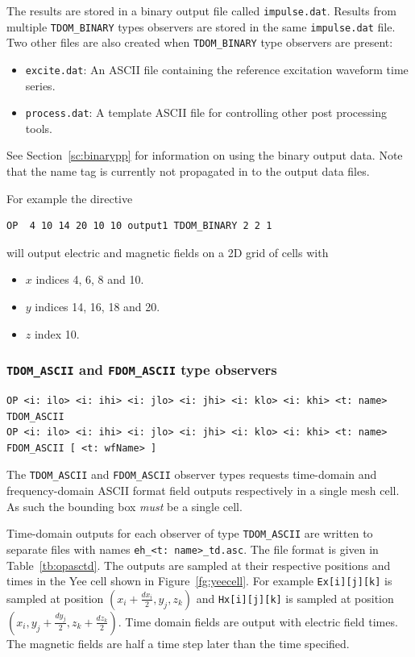 \documentclass[onecolumn,a4paper]{article}
\numberwithin{equation}{section}
\begin{document}
The results are stored in a binary output file called \texttt{impulse.dat}. Results from multiple
\texttt{TDOM\_BINARY} types observers are stored in the same \texttt{impulse.dat} file. Two other
files are also created when \texttt{TDOM\_BINARY} type observers are present: 
\begin{itemize}
 \item \texttt{excite.dat}: An ASCII file containing the reference excitation waveform time series.
 \item \texttt{process.dat}: A template ASCII file for controlling other post processing tools.
\end{itemize}
See Section~\ref{sc:binarypp} for information on using the binary output data. Note that the name tag is currently
not propagated in to the output data files.

For example the directive 
\begin{verbatim}
OP  4 10 14 20 10 10 output1 TDOM_BINARY 2 2 1
\end{verbatim}
will output electric and magnetic fields on a 2D grid of cells with 
\begin{itemize}
 \item $x$ indices 4, 6, 8 and 10.
 \item $y$ indices 14, 16, 18 and 20. 
 \item $z$ index 10. 
\end{itemize}

\subsubsection{\texttt{TDOM\_ASCII} and \texttt{FDOM\_ASCII} type observers}

\begin{verbatim}
OP <i: ilo> <i: ihi> <i: jlo> <i: jhi> <i: klo> <i: khi> <t: name> TDOM_ASCII
OP <i: ilo> <i: ihi> <i: jlo> <i: jhi> <i: klo> <i: khi> <t: name> FDOM_ASCII [ <t: wfName> ]
\end{verbatim}

The \texttt{TDOM\_ASCII} and \texttt{FDOM\_ASCII} observer types requests time-domain and 
frequency-domain ASCII format field outputs respectively in a single mesh cell. As such the 
bounding box {\em must} be a single cell. 

Time-domain outputs for each observer of type \texttt{TDOM\_ASCII} are written to separate files 
with names \texttt{eh\_<t:~name>\_td.asc}. The file format is given in Table~\ref{tb:opasctd}.
The outputs are sampled at their respective positions and times in the Yee cell shown in 
Figure~\ref{fg:yeecell}. For example \texttt{Ex[i][j][k]} is sampled 
at position  $(x_i + \frac{dx_i}{2} , y_j , z_k )$ and \texttt{Hx[i][j][k]} is sampled at position 
$(x_i , y_j + \frac{dy_j}{2}, z_k + \frac{dz_k}{2} )$. Time domain fields are output with electric field times. 
The magnetic fields are half a time step later than the time specified. 
\end{document}
